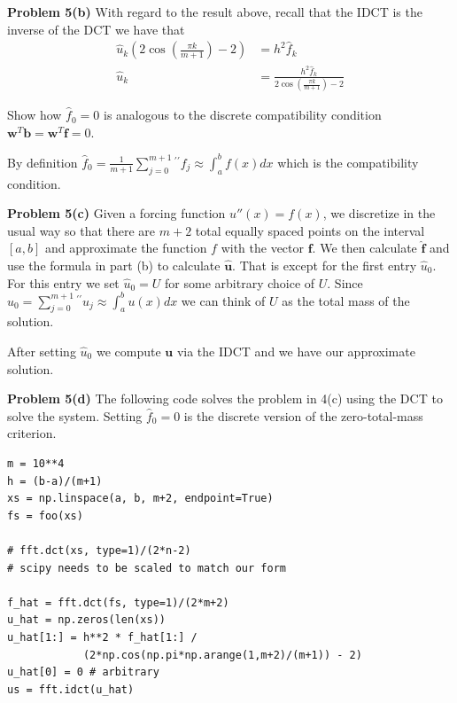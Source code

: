 \documentclass[12pt]{article}
\newcommand{\problem}[1]{\hspace{-4 ex} \large \textbf{Problem #1} }
\renewcommand{\vec}[1]{\boldsymbol{\mathbf{#1}}}
\begin{document}
\bigbreak
\problem{5(b)} With regard to the result above, recall that the IDCT is the inverse of the DCT we have that 
\begin{align*}
	\hat{u}_k \left( 2 \cos \left(\frac{\pi k}{m+1} \right) - 2 \right) &= h^2\hat{f}_k \\
	\hat{u}_k &= \frac{h^2\hat{f}_k}{2 \cos \left(\frac{\pi k}{m+1} \right) - 2}
\end{align*}
\bigbreak

Show how $\hat{f}_0 = 0$ is analogous to the discrete compatibility condition $\vec{w}^T\vec{b} = \vec{w}^T\vec{f} = 0$.  \bigbreak

By definition $\hat{f}_0 = \frac{1}{m+1}\sum\limits_{j=0}^{m+1} {}^{\prime\prime} f_j \approx \int_{a}^{b} f(x) dx$ which is the compatibility condition.

\bigbreak
\problem{5(c)} Given a forcing function $u''(x) = f(x)$, we discretize in the usual way so that there are $m+2$ total equally spaced points on the interval $[a, b]$ and approximate the function $f$ with the vector $\vec{f}$. We then calculate $\hat{\vec{f}}$ and use the formula in part (b) to calculate $\hat{\vec{u}}$. That is except for the first entry $\hat{u}_0$. For this entry we set $\hat{u}_0 = U$ for some arbitrary choice of $U$. Since $\hat{u}_0 = \sum\limits_{j=0}^{m+1}{}^{\prime\prime} u_j \approx \int_a^{b} u(x) dx$ we can think of $U$ as the total mass of the solution. \bigbreak

After setting $\hat{u}_0$ we compute $\vec{u}$ via the IDCT and we have our approximate solution.

\bigbreak
\problem{5(d)} The following code solves the problem in 4(c) using the DCT to solve the system. Setting $\hat{f}_0 = 0$ is the discrete version of the zero-total-mass criterion.

\begin{lstlisting}
m = 10**4
h = (b-a)/(m+1)
xs = np.linspace(a, b, m+2, endpoint=True)
fs = foo(xs)

# fft.dct(xs, type=1)/(2*n-2)
# scipy needs to be scaled to match our form

f_hat = fft.dct(fs, type=1)/(2*m+2)
u_hat = np.zeros(len(xs))
u_hat[1:] = h**2 * f_hat[1:] / 
			(2*np.cos(np.pi*np.arange(1,m+2)/(m+1)) - 2)
u_hat[0] = 0 # arbitrary
us = fft.idct(u_hat)
\end{lstlisting}
\end{document}
